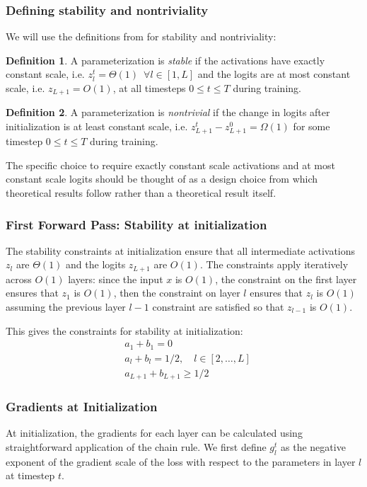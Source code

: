 \documentclass{article}
\theoremstyle{plain}
\theoremstyle{definition}
\newtheorem{appendixdef}{Definition}[section]
\theoremstyle{remark}
\begin{document}
\subsubsection{Defining stability and nontriviality}
\label{app:theory_stability_nontriviality_def}

We will use the definitions from \citet{yang2021tensoriv} for stability and nontriviality:
\begin{appendixdef}
A parameterization is \emph{stable} if the activations have exactly constant scale, i.e. $z_l^t = \Theta(1) \enspace \forall l \in [1,L]$ and the logits are at most constant scale, i.e. $z_{L+1} = O(1)$, at all timesteps $0 \leq t \leq T$ during training.
\end{appendixdef}
\begin{appendixdef}
A parameterization is \emph{nontrivial} if the change in logits after initialization is at least constant scale, i.e. $z_{L+1}^t - z_{L+1}^0 = \Omega(1)$ for some timestep $0 \leq t \leq T$ during training.
\end{appendixdef}
The specific choice to require exactly constant scale activations and at most constant scale logits should be thought of as a design choice from which theoretical results follow rather than a theoretical result itself.

\subsubsection{First Forward Pass: Stability at initialization}
\label{app:theory_first_forward}
The stability constraints at initialization ensure that all intermediate activations $z_l$ are $\Theta(1)$ and the logits $z_{L+1}$ are $O(1)$. The constraints apply iteratively across $O(1)$ layers: since the input $x$ is $O(1)$, the constraint on the first layer ensures that $z_1$ is $O(1)$, then the constraint on layer $l$ ensures that $z_l$ is $O(1)$ assuming the previous layer $l-1$ constraint are satisfied so that $z_{l-1}$ is $O(1)$.

This gives the constraints for stability at initialization:
\begin{align*}
    &a_1 + b_1 = 0\\
    &a_l + b_l = 1/2,\quad l \in [2, \ldots, L]\\
    &a_{L+1} + b_{L+1} \geq 1/2
\end{align*}

\subsubsection{Gradients at Initialization}
\label{app:theory_gradients_init}
At initialization, the gradients for each layer can be calculated using straightforward application of the chain rule. We first define $g_l^t$ as the negative exponent of the gradient scale of the loss with respect to the parameters in layer $l$ at timestep $t$.
\end{document}
